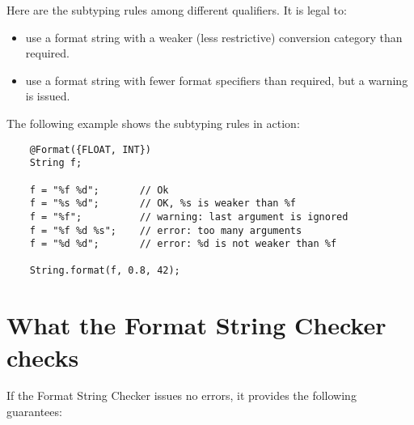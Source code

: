 \label{formatter-format-subtyping}
Here are the subtyping rules among different
qualifiers.
It is legal to:

\begin{itemize}
\item use a format string with a weaker (less restrictive) conversion category than required.
\item use a format string with fewer format specifiers than required, but a warning is issued.
\end{itemize}

The following example shows the subtyping rules in action:

\begin{Verbatim}
    @Format({FLOAT, INT})
    String f;

    f = "%f %d";       // Ok
    f = "%s %d";       // OK, %s is weaker than %f
    f = "%f";          // warning: last argument is ignored
    f = "%f %d %s";    // error: too many arguments
    f = "%d %d";       // error: %d is not weaker than %f

    String.format(f, 0.8, 42);
\end{Verbatim}

\section{What the Format String Checker checks\label{formatter-guarantees}}

If the Format String Checker issues no errors, it provides the following guarantees:

